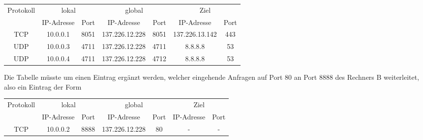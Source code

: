 \documentclass{../exercisesheet}
\begin{document}
\begin{exercise}{4}
\begin{subexercise}

\end{subexercise}
\begin{subexercise}

\end{subexercise}
\begin{subexercise}

\end{subexercise}
\end{exercise}


\begin{exercise}{2}
\begin{subexercise}
\begin{center}
\begin{tabular}{c|cc|cc|cc}
\multirow{2}{*}{Protokoll} & \multicolumn{2}{c}{lokal} & \multicolumn{2}{c}{global} & \multicolumn{2}{c}{Ziel} \\
 & IP-Adresse & Port & IP-Adresse & Port & IP-Adresse & Port \\
\hline
TCP & 10.0.0.1 & 8051 & 137.226.12.228 & 8051 & 137.226.13.142 & 443 \\
UDP & 10.0.0.3 & 4711 & 137.226.12.228 & 4711 & 8.8.8.8 & 53 \\
UDP & 10.0.0.4 & 4711 & 137.226.12.228 & 4712 & 8.8.8.8 & 53 \\
\end{tabular}
\end{center}
\end{subexercise}
\begin{subexercise}
Die Tabelle müsste um einen Eintrag ergänzt werden, welcher eingehende Anfragen auf Port 80 an Port 8888 des Rechners B weiterleitet, also ein Eintrag der Form\\
\begin{center}
\begin{tabular}{c|cc|cc|cc}
\multirow{2}{*}{Protokoll} & \multicolumn{2}{c}{lokal} & \multicolumn{2}{c}{global} & \multicolumn{2}{c}{Ziel} \\
 & IP-Adresse & Port & IP-Adresse & Port & IP-Adresse & Port \\
\hline
TCP & 10.0.0.2 & 8888 & 137.226.12.228 & 80 & - & - \\
\end{tabular}
\end{center}
\end{subexercise}
\end{exercise}
\end{document}
